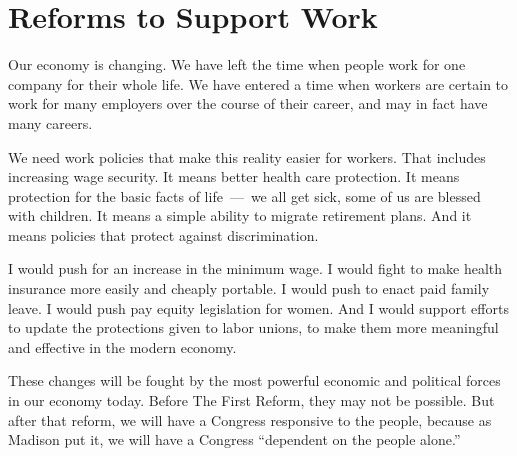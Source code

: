 \section{Reforms to Support Work}

Our economy is changing. We have left the time when people work for one company for their whole life. We have entered a time when workers are certain to work for many employers over the course of their career, and may in fact have many careers.

We need work policies that make this reality easier for workers. That includes increasing wage security. It means better health care protection. It means protection for the basic facts of life~---~we all get sick, some of us are blessed with children. It means a simple ability to migrate retirement plans. And it means policies that protect against discrimination.

I would push for an increase in the minimum wage. I would fight to make health insurance more easily and cheaply portable. I would push to enact paid family leave. I would push pay equity legislation for women. And I would support efforts to update the protections given to labor unions, to make them more meaningful and effective in the modern economy.

These changes will be fought by the most powerful economic and political forces in our economy today. Before The First Reform, they may not be possible. But after that reform, we will have a Congress responsive to the people, because as Madison put it, we will have a Congress ``dependent on the people alone.''
